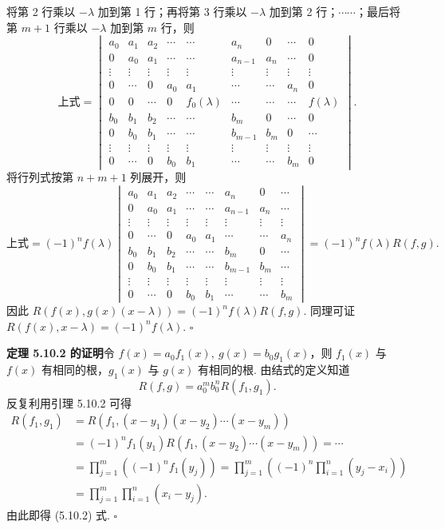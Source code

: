 \documentclass[UTF8,12pt,a4paper,fontset=fandol]{ctexart}
\begin{document}
将第 2 行乘以 $-\lambda$ 加到第 1 行；再将第 3 行乘以 $-\lambda$ 加到第 2 行；$\cdots\cdots$；最后将第 $m+1$ 行乘以 $-\lambda$ 加到第 $m$ 行，则
\[
\text{上式}=
\begin{vmatrix}
a_0&a_1&a_2&\cdots&\cdots&a_n&0&\cdots&0\\
0&a_0&a_1&\cdots&\cdots&a_{n-1}&a_n&\cdots&0\\
\vdots&\vdots&\vdots&\vdots&\vdots&\vdots&\vdots&\vdots&\vdots\\
0&\cdots&0&a_0&a_1&\cdots&\cdots&a_n&0\\
0&0&\cdots&0&f_0(\lambda)&\cdots&\cdots&\cdots&f(\lambda)\\
b_0&b_1&b_2&\cdots&\cdots&b_m&0&\cdots&0\\
0&b_0&b_1&\cdots&\cdots&b_{m-1}&b_m&0&\cdots\\
\vdots&\vdots&\vdots&\vdots&\vdots&\vdots&\vdots&\vdots&\vdots\\
0&\cdots&0&b_0&b_1&\cdots&\cdots&b_m&0
\end{vmatrix}.
\]
将行列式按第 $n+m+1$ 列展开，则
\[
\text{上式}=(-1)^nf(\lambda)
\begin{vmatrix}
a_0&a_1&a_2&\cdots&\cdots&a_n&0&\cdots\\
0&a_0&a_1&\cdots&\cdots&a_{n-1}&a_n&\cdots\\
\vdots&\vdots&\vdots&\vdots&\vdots&\vdots&\vdots&\vdots\\
0&\cdots&0&a_0&a_1&\cdots&\cdots&a_n\\
b_0&b_1&b_2&\cdots&\cdots&b_m&0&\cdots\\
0&b_0&b_1&\cdots&\cdots&b_{m-1}&b_m&\cdots\\
\vdots&\vdots&\vdots&\vdots&\vdots&\vdots&\vdots&\vdots\\
0&\cdots&0&b_0&b_1&\cdots&\cdots&b_m
\end{vmatrix}
=(-1)^nf(\lambda)R(f,g).
\]
因此 $R(f(x),g(x)(x-\lambda))=(-1)^nf(\lambda)R(f,g)$. 同理可证 $R(f(x),x-\lambda)=(-1)^nf(\lambda)$. $\square$

\noindent\textbf{定理 5.10.2 的证明}\quad 令 $f(x)=a_0f_1(x),\ g(x)=b_0g_1(x)$，则 $f_1(x)$ 与 $f(x)$ 有相同的根，$g_1(x)$ 与 $g(x)$ 有相同的根. 由结式的定义知道
\[
R(f,g)=a_0^mb_0^nR(f_1,g_1).
\]
反复利用引理 5.10.2 可得
\[
\begin{aligned}
R(f_1,g_1)
&=R(f_1,(x-y_1)(x-y_2)\cdots(x-y_m))\\
&=(-1)^nf_1(y_1)R(f_1,(x-y_2)\cdots(x-y_m))=\cdots\\
&=\prod_{j=1}^m\left((-1)^nf_1(y_j)\right)
=\prod_{j=1}^m\left((-1)^n\prod_{i=1}^n(y_j-x_i)\right)\\
&=\prod_{j=1}^m\prod_{i=1}^n(x_i-y_j).
\end{aligned}
\]
由此即得 (5.10.2) 式. $\square$
\end{document}

